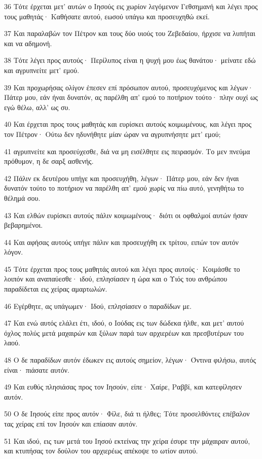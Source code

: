 \par 36 Τότε έρχεται μετ' αυτών ο Ιησούς εις χωρίον λεγόμενον Γεθσημανή και λέγει προς τους μαθητάς· Καθήσατε αυτού, εωσού υπάγω και προσευχηθώ εκεί.
\par 37 Και παραλαβών τον Πέτρον και τους δύο υιούς του Ζεβεδαίου, ήρχισε να λυπήται και να αδημονή.
\par 38 Τότε λέγει προς αυτούς· Περίλυπος είναι η ψυχή μου έως θανάτου· μείνατε εδώ και αγρυπνείτε μετ' εμού.
\par 39 Και προχωρήσας ολίγον έπεσεν επί πρόσωπον αυτού, προσευχόμενος και λέγων· Πάτερ μου, εάν ήναι δυνατόν, ας παρέλθη απ' εμού το ποτήριον τούτο· πλην ουχί ως εγώ θέλω, αλλ' ως συ.
\par 40 Και έρχεται προς τους μαθητάς και ευρίσκει αυτούς κοιμωμένους, και λέγει προς τον Πέτρον· Ούτω δεν ηδυνήθητε μίαν ώραν να αγρυπνήσητε μετ' εμού;
\par 41 αγρυπνείτε και προσεύχεσθε, διά να μη εισέλθητε εις πειρασμόν. Το μεν πνεύμα πρόθυμον, η δε σαρξ ασθενής.
\par 42 Πάλιν εκ δευτέρου υπήγε και προσευχήθη, λέγων· Πάτερ μου, εάν δεν ήναι δυνατόν τούτο το ποτήριον να παρέλθη απ' εμού χωρίς να πίω αυτό, γενηθήτω το θέλημά σου.
\par 43 Και ελθών ευρίσκει αυτούς πάλιν κοιμωμένους· διότι οι οφθαλμοί αυτών ήσαν βεβαρημένοι.
\par 44 Και αφήσας αυτούς υπήγε πάλιν και προσευχήθη εκ τρίτου, ειπών τον αυτόν λόγον.
\par 45 Τότε έρχεται προς τους μαθητάς αυτού και λέγει προς αυτούς· Κοιμάσθε το λοιπόν και αναπαύεσθε· ιδού, επλησίασεν η ώρα και ο Υιός του ανθρώπου παραδίδεται εις χείρας αμαρτωλών.
\par 46 Εγέρθητε, ας υπάγωμεν· Ιδού, επλησίασεν ο παραδίδων με.
\par 47 Και ενώ αυτός ελάλει έτι, ιδού, ο Ιούδας εις των δώδεκα ήλθε, και μετ' αυτού όχλος πολύς μετά μαχαιρών και ξύλων παρά των αρχιερέων και πρεσβυτέρων του λαού.
\par 48 Ο δε παραδίδων αυτόν έδωκεν εις αυτούς σημείον, λέγων· Όντινα φιλήσω, αυτός είναι· πιάσατε αυτόν.
\par 49 Και ευθύς πλησιάσας προς τον Ιησούν, είπε· Χαίρε, Ραββί, και κατεφίλησεν αυτόν.
\par 50 Ο δε Ιησούς είπε προς αυτόν· Φίλε, διά τι ήλθες; Τότε προσελθόντες επέβαλον τας χείρας επί τον Ιησούν και επίασαν αυτόν.
\par 51 Και ιδού, εις των μετά του Ιησού εκτείνας την χείρα έσυρε την μάχαιραν αυτού, και κτυπήσας τον δούλον του αρχιερέως απέκοψε το ωτίον αυτού.
